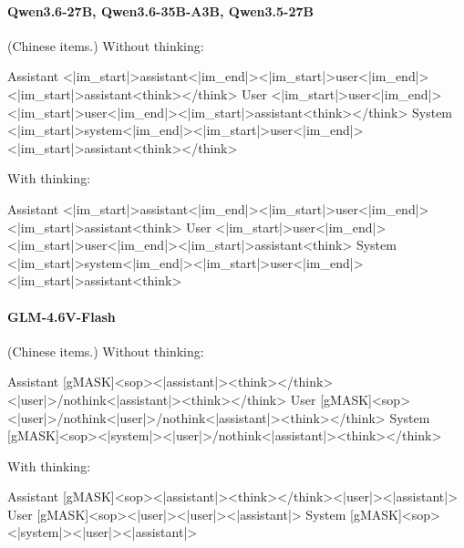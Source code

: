 \paragraph{Qwen3.6-27B, Qwen3.6-35B-A3B, Qwen3.5-27B} (Chinese items.)
\noindent Without thinking:
\begin{Rendering}
Assistant  <|im_start|>assistant\NL{}<|im_end|>\NL{}<|im_start|>user\NL{}<|im_end|>\NL{}<|im_start|>assistant\NL{}<think>\NL{}\NL{}</think>\NL{}\NL{}
User       <|im_start|>user\NL{}<|im_end|>\NL{}<|im_start|>user\NL{}<|im_end|>\NL{}<|im_start|>assistant\NL{}<think>\NL{}\NL{}</think>\NL{}\NL{}
System     <|im_start|>system\NL{}<|im_end|>\NL{}<|im_start|>user\NL{}<|im_end|>\NL{}<|im_start|>assistant\NL{}<think>\NL{}\NL{}</think>\NL{}\NL{}
\end{Rendering}
\noindent With thinking:
\begin{Rendering}
Assistant  <|im_start|>assistant\NL{}<|im_end|>\NL{}<|im_start|>user\NL{}<|im_end|>\NL{}<|im_start|>assistant\NL{}<think>\NL{}
User       <|im_start|>user\NL{}<|im_end|>\NL{}<|im_start|>user\NL{}<|im_end|>\NL{}<|im_start|>assistant\NL{}<think>\NL{}
System     <|im_start|>system\NL{}<|im_end|>\NL{}<|im_start|>user\NL{}<|im_end|>\NL{}<|im_start|>assistant\NL{}<think>\NL{}
\end{Rendering}
\paragraph{GLM-4.6V-Flash} (Chinese items.)
\noindent Without thinking:
\begin{Rendering}
Assistant  [gMASK]<sop><|assistant|>\NL{}<think></think>\NL{}<|user|>\NL{}/nothink<|assistant|>\NL{}<think></think>\NL{}
User       [gMASK]<sop><|user|>\NL{}/nothink<|user|>\NL{}/nothink<|assistant|>\NL{}<think></think>\NL{}
System     [gMASK]<sop><|system|>\NL{}<|user|>\NL{}/nothink<|assistant|>\NL{}<think></think>\NL{}
\end{Rendering}
\noindent With thinking:
\begin{Rendering}
Assistant  [gMASK]<sop><|assistant|>\NL{}<think></think>\NL{}<|user|>\NL{}<|assistant|>\NL{}
User       [gMASK]<sop><|user|>\NL{}<|user|>\NL{}<|assistant|>\NL{}
System     [gMASK]<sop><|system|>\NL{}<|user|>\NL{}<|assistant|>\NL{}
\end{Rendering}
